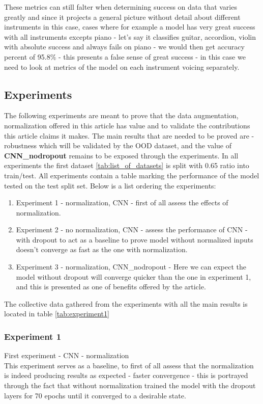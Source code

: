 \documentclass[a4paper]{article}
\begin{document}
These metrics can still falter when determining success on data that varies greatly and since it projects a general picture without detail about different instruments in this case, cases where for example a model has very great success with all instruments excepts piano - let's say it classifies guitar, accordion, violin with absolute success and always fails on piano - we would then get accuracy percent of 95.8\% - this presents a false sense of great success - in this case we need to look at metrics of the model on each instrument voicing separately.

\subsection{Experiments}
The following experiments are meant to prove that the data augmentation, normalization offered in this article has value and to validate the contributions this article claims it makes.
The main results that are needed to be proved are - robustness which will be validated by the OOD dataset, and the value of \textbf{CNN\_nodropout} remains to be exposed through the experiments.
In all experiments the first dataset \ref{tab:list_of_datasets} is split with 0.65 ratio into train/test.
All experiments contain a table marking the performance of the model tested on the test split set.
Below is a list ordering the experiments:
\begin{enumerate}
    \item Experiment 1 - normalization, CNN - first of all assess the effects of normalization.
    \item Experiment 2 - no normalization, CNN - assess the performance of CNN - with dropout to act as a baseline to prove model without normalized inputs doesn't converge as fast as the one with normalization.
    \item Experiment 3 - normalization, CNN\_nodropout - Here we can expect the model without dropout will converge quicker than the one in experiment 1, and this is presented as one of benefits offered by the article.
\end{enumerate}

The collective data gathered from the experiments with all the main results is located in table \ref{tab:experiment1} 

\subsubsection{Experiment 1}
First experiment - CNN - normalization\\
\noindent This experiment serves as a baseline, to first of all assess that the normalization is indeed producing results as expected - faster convergence - this is portrayed through the fact that without normalization \cite{baseline} trained the model with the dropout layers for 70 epochs until it converged to a desirable state.\\
\end{document}
